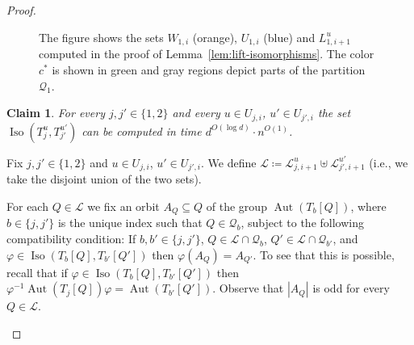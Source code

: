 \PassOptionsToPackage{dvipsnames,svgnames}{xcolor}\documentclass[10pt,a4paper]{article}
\newtheorem{claim}{Claim}[section]
\newcommand{\CL}{{\mathcal L}}
\newcommand{\CQ}{{\mathcal Q}}
\DeclareMathOperator{\Aut}{Aut}
\DeclareMathOperator{\Iso}{Iso}
\begin{document}
\begin{proof}
\begin{figure}
{
  }
  \caption{The figure shows the sets $W_{1,i}$ (orange), $U_{1,i}$ (blue) and $L_{1,i+1}^{u}$ computed in the proof of Lemma~\ref{lem:lift-isomorphisms}.
   The color $c^*$ is shown in green and gray regions depict parts of the partition $\CQ_1$.}
  \label{fig:extend-isomorphisms}
 \end{figure}

 \begin{claim}
  \label{cl:compute-isomorphism-set-local}
  For every $j,j' \in \{1,2\}$ and every $u \in U_{j,i}$, $u' \in U_{j',i}$ the set $\Iso(T_j^u,T_{j'}^{u'})$ can be computed in time $d^{O(\log d)} \cdot n^{O(1)}$.
 \end{claim}

 \begin{subproof}
  Fix $j,j' \in \{1,2\}$ and $u \in U_{j,i}$, $u' \in U_{j',i}$.
  We define $\CL \coloneqq \CL_{j,i+1}^{u} \uplus \CL_{j',i+1}^{u'}$ (i.e., we take the disjoint union of the two sets).


  For each $Q \in \CL$ we fix an orbit $A_Q \subseteq Q$ of the group $\Aut(T_b[Q])$, where $b \in \{j,j'\}$ is the unique index such that $Q \in \CQ_b$, subject to the following compatibility condition:
  If $b,b' \in \{j,j'\}$, $Q \in \CL \cap \CQ_b$, $Q' \in \CL \cap \CQ_{b'}$, and $\varphi \in \Iso(T_b[Q],T_{b'}[Q'])$ then $\varphi(A_Q) = A_{Q'}$.
  To see that this is possible, recall that if $\varphi \in \Iso(T_b[Q],T_{b'}[Q'])$ then $\varphi^{-1}\Aut(T_j[Q])\varphi = \Aut(T_{b'}[Q'])$.
  Observe that $|A_Q|$ is odd for every $Q \in \CL$.


\end{subproof}
\end{proof}
\end{document}
